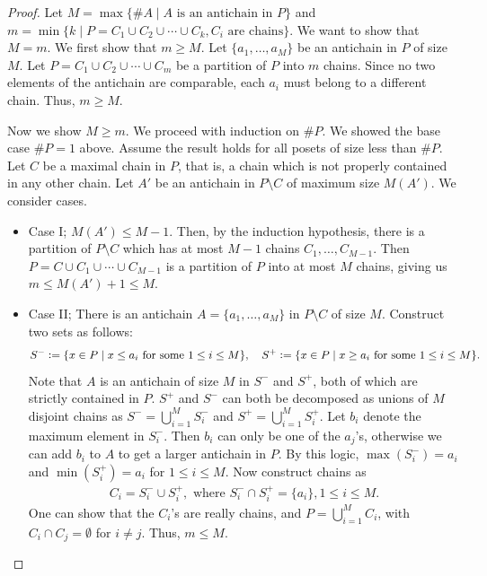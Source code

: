 \begin{proof}
    Let $M = \max\{\#A \mid A \text{ is an antichain in } P\}$ and $m = \min \{k \mid P = C_{1} \cup C_{2} \cup \cdots \cup C_{k}, C_{i} \text{ are chains}\}$. We want to show that $M = m$. We first show that $m \geq M$. Let $\{a_{1},\ldots,a_{M}\}$ be an antichain in $P$ of size $M$. Let $P = C_{1} \cup C_{2} \cup \cdots \cup C_{m}$ be a partition of $P$ into $m$ chains. Since no two elements of the antichain are comparable, each $a_{i}$ must belong to a different chain. Thus, $m \geq M$.

    Now we show $M \geq m$. We proceed with induction on $\# P$. We showed the base case $\# P = 1$ above. Assume the result holds for all posets of size less than $\# P$. Let $C$ be a maximal chain in $P$, that is, a chain which is not properly contained in any other chain. Let $A'$ be an antichain in $P \setminus C$ of maximum size $M(A')$. We consider cases.
    \begin{itemize}
        \item Case I; $M(A') \leq M - 1$. Then, by the induction hypothesis, there is a partition of $P \setminus C$ which has at most $M-1$ chains $C_{1},\ldots,C_{M-1}$. Then $P = C \cup C_{1} \cup \cdots \cup C_{M-1}$ is a partition of $P$ into at most $M$ chains, giving us $m \leq M(A') + 1 \leq M$.
        \item Case II; There is an antichain $A = \{a_{1},\ldots,a_{M}\}$ in $P \setminus C$ of size $M$. Construct two sets as follows:
        \begin{align}
            S^{-} \vcentcolon= \{x \in P \mid x \leq a_{i} \text{ for some } 1 \leq i \leq M\}, \quad S^{+} \vcentcolon= \{x \in P \mid x \geq a_{i} \text{ for some } 1 \leq i \leq M\}.
        \end{align}
        Note that $A$ is an antichain of size $M$ in $S^{-}$ and $S^{+}$, both of which are strictly contained in $P$. $S^{+}$ and $S^{-}$ can both be decomposed as unions of $M$ disjoint chains as $S^{-} = \bigcup_{i=1}^{M} S_{i}^{-}$ and $S^{+} = \bigcup_{i=1}^{M} S_{i}^{+}$. Let $b_{i}$ denote the maximum element in $S_{i}^{-}$. Then $b_{i}$ can only be one of the $a_{j}$'s, otherwise we can add $b_{i}$ to $A$ to get a larger antichain in $P$. By this logic, $\max(S_{i}^{-}) = a_{i}$ and $\min(S_{i}^{+}) = a_{i}$ for $1 \leq i \leq M$. Now construct chains as
        \begin{align}
            C_{i} = S_{i}^{-} \cup S_{i}^{+}, \text{ where } S_{i}^{-} \cap S_{i}^{+} = \{a_{i}\}, 1 \leq i \leq M.
        \end{align}
        One can show that the $C_{i}$'s are really chains, and $P = \bigcup_{i=1}^{M} C_{i}$, with $C_{i} \cap C_{j} = \emptyset$ for $i \neq j$. Thus, $m \leq M$.
    \end{itemize}
\end{proof}


